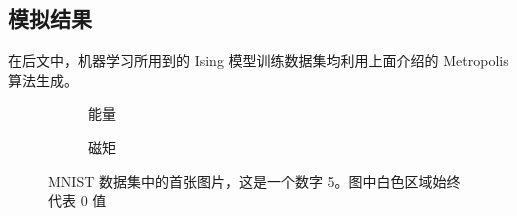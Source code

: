\subsection{模拟结果}

在后文中，机器学习所用到的 Ising 模型训练数据集均利用上面介绍的 Metropolis 算法生成。

\begin{figure}[htb]
  \centering
  \begin{subfigure}[b]{0.49\textwidth}
    \centering
    \caption{能量}
  \end{subfigure}
  \begin{subfigure}[b]{0.49\textwidth}
    \centering
    \caption{磁矩}
  \end{subfigure}
  \caption{MNIST 数据集中的首张图片，这是一个数字 5。图中白色区域始终代表 0 值}
  \label{fig:ising-e-m}
\end{figure}
